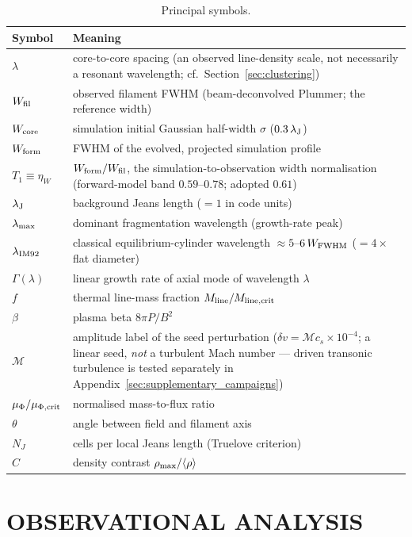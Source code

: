 \documentclass[usenatbib,twoside,twocolumn]{mnras}
\begin{document}
\begin{table}
\caption{Principal symbols.}
\label{tab:symbols}
\footnotesize
\setlength{\tabcolsep}{4pt}
\begin{tabular}{lp{6.1cm}}
\toprule
Symbol & Meaning \\
\midrule
$\lambda$ & core-to-core spacing (an observed line-density scale, not necessarily a resonant wavelength; cf.\ Section~\ref{sec:clustering}) \\
$W_{\rm fil}$ & observed filament FWHM (beam-deconvolved Plummer; the reference width) \\
$W_{\rm core}$ & simulation initial Gaussian half-width $\sigma$ ($0.3\,\lambda_{\rm J}$) \\
$W_{\rm form}$ & FWHM of the evolved, projected simulation profile \\
$T_1\!\equiv\!\eta_W$ & $W_{\rm form}/W_{\rm fil}$, the simulation-to-observation width normalisation (forward-model band $0.59$--$0.78$; adopted $0.61$) \\
$\lambda_{\rm J}$ & background Jeans length ($=1$ in code units) \\
$\lambda_{\rm max}$ & dominant fragmentation wavelength (growth-rate peak) \\
$\lambda_{\rm IM92}$ & classical equilibrium-cylinder wavelength $\approx5$--$6\,W_{\rm FWHM}$ ($=4\times$ flat diameter) \\
$\Gamma(\lambda)$ & linear growth rate of axial mode of wavelength $\lambda$ \\
$f$ & thermal line-mass fraction $M_{\rm line}/M_{\rm line,crit}$ \\
$\beta$ & plasma beta $8\pi P/B^2$ \\
$\mathcal{M}$ & amplitude label of the seed perturbation ($\delta v=\mathcal{M}c_s\times10^{-4}$; a linear seed, \emph{not} a turbulent Mach number --- driven transonic turbulence is tested separately in Appendix~\ref{sec:supplementary_campaigns}) \\
$\mu_\Phi/\mu_{\Phi,\rm crit}$ & normalised mass-to-flux ratio \\
$\theta$ & angle between field and filament axis \\
$N_J$ & cells per local Jeans length (Truelove criterion) \\
$C$ & density contrast $\rho_{\rm max}/\langle\rho\rangle$ \\
\bottomrule
\end{tabular}
\end{table}

\section{OBSERVATIONAL ANALYSIS}
\end{document}
